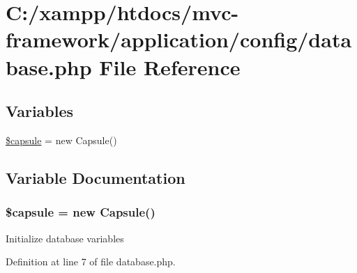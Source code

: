 \hypertarget{database_8php}{}\section{C\+:/xampp/htdocs/mvc-\/framework/application/config/database.php File Reference}
\label{database_8php}
\subsection*{Variables}
\begin{DoxyCompactItemize}
\item 
\hyperlink{database_8php_afe5d117e2943179b1ebb3fb365d3eb24}{\$capsule} = new Capsule()
\end{DoxyCompactItemize}


\subsection{Variable Documentation}
\hypertarget{database_8php_afe5d117e2943179b1ebb3fb365d3eb24}{}
\subsubsection[{\$capsule}]{\setlength{\rightskip}{0pt plus 5cm}\$capsule = new Capsule()}\label{database_8php_afe5d117e2943179b1ebb3fb365d3eb24}
Initialize database variables 

Definition at line 7 of file database.\+php.

